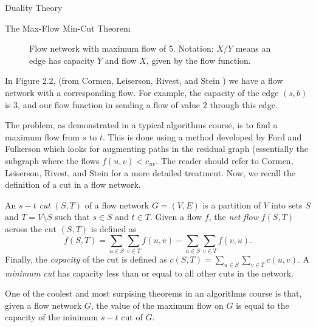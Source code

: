 \begin{section}{Duality Theory}
\begin{subsection}{The Max-Flow Min-Cut Theorem}
\begin{figure}[h]
		\caption{Flow network with maximum flow of 5. Notation: $X/Y$ means an edge has capacity 
		$Y$ and flow $X$, given by the flow function.}
	\end{figure}
	In Figure 2.2, (from Cormen, Leiserson, Rivest, and Stein \cite{cormen2009introduction}) 
	we have a flow network with a corresponding flow. For example, the capacity 
	of the edge $(s,b)$ is $3$, and our flow function in sending a flow of value $2$ through 
	this edge.

	The problem, as demonstrated in a typical algorithms course, is to find a maximum flow from $s$ 
	to $t$. This is done using a method developed by Ford and Fulkerson which looks for augmenting 
	paths in the residual graph (essentially the subgraph where the flows $f(u,v) < c_{uv}$. 
	The reader should refer to Cormen, Leiserson, Rivest, and Stein 
	\cite{cormen2009introduction} for a more detailed treatment. Now, we recall the definition 
	of a cut in a flow network.
	\begin{definition}
		An $s-t$ \emph{cut} $(S,T)$ of a flow network $G=(V,E)$ is a partition of $V$ into 
		sets $S$ and $T = V\setminus S$ such that $s\in S$ and $t\in T$. Given a flow $f$, the 
		\emph{net flow} $f(S,T)$ across the cut $(S,T)$ is defined as 
		\[
			f(S,T) = \sum_{u\in S} \sum_{v\in T} f(u,v) - \sum_{u\in S} \sum_{v\in T} 
			f(v,u).
		\]
		Finally, the \emph{capacity} of the cut is defined as $c(S,T) = 
		\sum_{u\in S} \sum_{v\in T} c(u,v)$. A \emph{minimum cut} has capacity less than or 
		equal to all other cuts in the network.
	\end{definition}
	One of the coolest and most surpising theorems in an algorithms course is that, given a flow 
	network $G$, the value of the maximum flow on $G$ is equal to the capacity of the minimum 
	$s-t$ cut of $G$.


\end{subsection}
\end{section}
